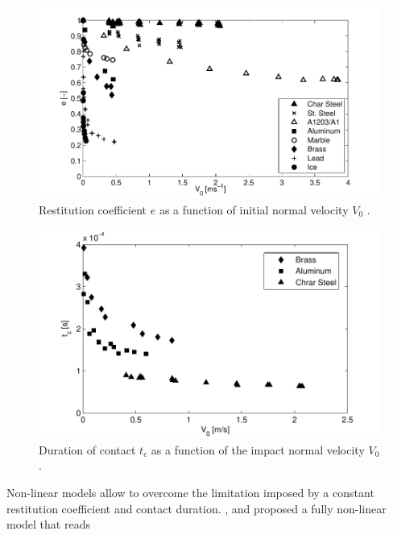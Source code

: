 %
\begin{figure}[ht!]
	\centering
	\includegraphics[width=0.73\linewidth]{Figures/3.Chapter/e_vo}
	\caption{Restitution coefficient $e$ as a function of initial normal velocity $V_0$ \citep{Kruggel-Emden-2007}.}
	\label{fig:Restitution_coeff} 
\end{figure}
%

%
%
%
\begin{figure}[ht!]
	\centering
	\includegraphics[width=0.70\linewidth]{Figures/3.Chapter/tc_vo}
	\caption{Duration of contact $t_c$ as a function of the impact normal velocity $V_0$ \citep{Kruggel-Emden-2007}.}
	\label{fig:t_c_exp} 
\end{figure}
%
%
%

Non-linear models allow to overcome the limitation imposed by a constant restitution coefficient and contact duration. \cite{Kuwabara-1987}, \cite{Brilliantov-1996} and \cite{Brilliantov-2001} proposed a fully non-linear model that reads

